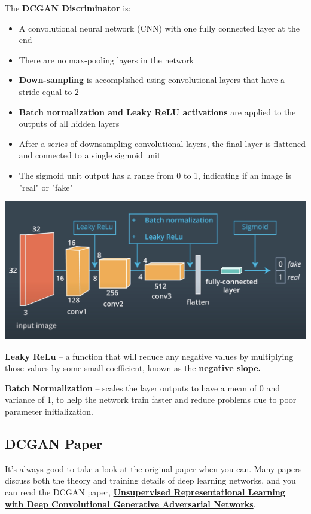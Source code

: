 The \textbf{DCGAN Discriminator} is:

\begin{itemize}
    \item A convolutional neural network (CNN) with one fully connected layer at the end
    \item There are no max-pooling layers in the network
    \item \textbf{Down-sampling} is accomplished using convolutional layers that have a stride equal to 2
    \item \textbf{Batch normalization and Leaky ReLU activations} are applied to the outputs of all hidden layers
    \item After a series of downsampling convolutional layers, the final layer is flattened and connected to a single sigmoid unit
    \item The sigmoid unit output has a range from 0 to 1, indicating if an image is "real" or "fake"
\end{itemize}

\includegraphics[width=1\linewidth]{img//genAdvNet//deepGAN/screen-shot-2022-05-10-at-10.27.10-am.jpeg}

\textbf{Leaky ReLu} – a function that will reduce any negative values by multiplying those values by some small coefficient, known as the \textbf{negative slope.}

\textbf{Batch Normalization} – scales the layer outputs to have a mean of 0 and variance of 1, to help the network train faster and reduce problems due to poor parameter initialization.

\subsection{DCGAN Paper}
It's always good to take a look at the original paper when you can. Many papers discuss both the theory and training details of deep learning networks, and you can read the DCGAN paper, \href{https://arxiv.org/pdf/1511.06434.pdf}{\textbf{Unsupervised Representational Learning with Deep Convolutional Generative Adversarial Networks}}.

